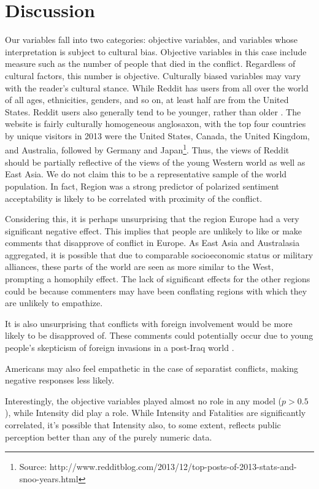 \section{Discussion}
Our variables fall into two categories: objective variables, and variables whose interpretation is subject to cultural bias. Objective variables in this case include measure such as the number of people that died in the conflict. Regardless of cultural factors, this number is objective. Culturally biased variables may vary with the reader's cultural stance. While Reddit has users from all over the world of all ages, ethnicities, genders, and so on, at least half are from the United States\cite{reddit-demo}. Reddit users also generally tend to be younger, rather than older \cite{pewinternet}. The website is fairly culturally homogeneous anglosaxon, with the top four countries by unique visitors in 2013 were the United States, Canada, the United Kingdom, and Australia, followed by Germany and Japan\footnote{Source: http://www.redditblog.com/2013/12/top-posts-of-2013-stats-and-snoo-years.html}. Thus, the views of Reddit should be partially reflective of the views of the young Western world as well as East Asia.  We do not claim this to be a representative sample of the world population.  In fact, Region was a strong predictor of polarized sentiment acceptability is likely to be correlated with proximity of the conflict.

Considering this, it is perhaps unsurprising that the region Europe had a very significant negative effect. This implies that people are unlikely to like or make comments that disapprove of conflict in Europe. As East Asia and Australasia aggregated, it is possible that due to comparable socioeconomic status or military alliances, these parts of the world are seen as more similar to the West, prompting a homophily effect. The lack of significant effects for the other regions could be because commenters may have been conflating regions with which they are unlikely to empathize.

It is also unsurprising that conflicts with foreign involvement would be more likely to be disapproved of. These comments could potentially occur due to young people's skepticism of foreign invasions in a post-Iraq world \cite{cato}. 

Americans may also feel empathetic in the case of separatist conflicts, making negative responses less likely.

Interestingly, the objective variables played almost no role in any model ($p > 0.5$), while Intensity did play a role. While Intensity and Fatalities are significantly correlated, it's possible that Intensity also, to some extent, reflects public perception better than any of the purely numeric data. 

